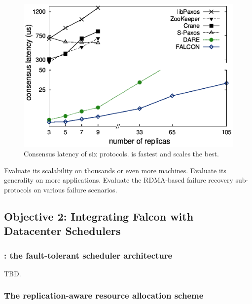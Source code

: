 \begin{figure}[!htb]
\centering
\includegraphics[width=0.34\textheight]{figures/traditional_paxos_latency.ps}
        \vspace{0.1in}
        \caption{Consensus latency of six \paxos protocols. \falcon is fastest 
and scales the best.}
        \label{fig:scalability}
\end{figure}

 Evaluate its scalability on thousands or even more 
machines. Evaluate its generality on more applications. Evaluate the RDMA-based 
failure recovery sub-protocols on various failure scenarios.

\vspace{-.15in}\subsection{Objective 2: 
Integrating Falcon with Datacenter Schedulers}\label{sec:detect}\vspace{-.075in}

\vspace{-.15in}\subsubsection{\tripod: the fault-tolerant scheduler 
architecture} 
\label{sec:scheduler-arch}\vspace{-.075in}

TBD.


\vspace{-.15in}\subsubsection{The replication-aware resource allocation scheme}
\label{sec:detect-arch}\vspace{-.075in}

